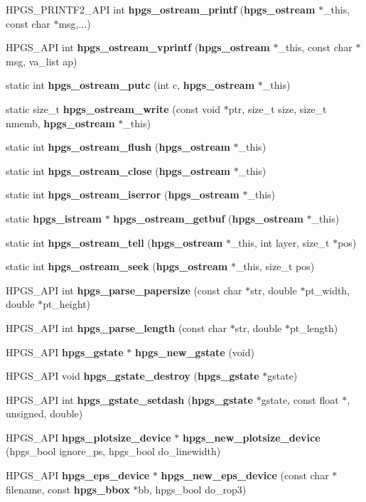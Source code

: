 \begin{DoxyCompactItemize}
\item 
HPGS\_\-PRINTF2\_\-API int {\bf hpgs\_\-ostream\_\-printf} ({\bf hpgs\_\-ostream} $\ast$\_\-this, const char $\ast$msg,...)
\item 
HPGS\_\-API int {\bf hpgs\_\-ostream\_\-vprintf} ({\bf hpgs\_\-ostream} $\ast$\_\-this, const char $\ast$msg, va\_\-list ap)
\item 
static int {\bf hpgs\_\-ostream\_\-putc} (int c, {\bf hpgs\_\-ostream} $\ast$\_\-this)
\item 
static size\_\-t {\bf hpgs\_\-ostream\_\-write} (const void $\ast$ptr, size\_\-t size, size\_\-t nmemb, {\bf hpgs\_\-ostream} $\ast$\_\-this)
\item 
static int {\bf hpgs\_\-ostream\_\-flush} ({\bf hpgs\_\-ostream} $\ast$\_\-this)
\item 
static int {\bf hpgs\_\-ostream\_\-close} ({\bf hpgs\_\-ostream} $\ast$\_\-this)
\item 
static int {\bf hpgs\_\-ostream\_\-iserror} ({\bf hpgs\_\-ostream} $\ast$\_\-this)
\item 
static {\bf hpgs\_\-istream} $\ast$ {\bf hpgs\_\-ostream\_\-getbuf} ({\bf hpgs\_\-ostream} $\ast$\_\-this)
\item 
static int {\bf hpgs\_\-ostream\_\-tell} ({\bf hpgs\_\-ostream} $\ast$\_\-this, int layer, size\_\-t $\ast$pos)
\item 
static int {\bf hpgs\_\-ostream\_\-seek} ({\bf hpgs\_\-ostream} $\ast$\_\-this, size\_\-t pos)
\item 
HPGS\_\-API int {\bf hpgs\_\-parse\_\-papersize} (const char $\ast$str, double $\ast$pt\_\-width, double $\ast$pt\_\-height)
\item 
HPGS\_\-API int {\bf hpgs\_\-parse\_\-length} (const char $\ast$str, double $\ast$pt\_\-length)
\item 
HPGS\_\-API {\bf hpgs\_\-gstate} $\ast$ {\bf hpgs\_\-new\_\-gstate} (void)
\item 
HPGS\_\-API void {\bf hpgs\_\-gstate\_\-destroy} ({\bf hpgs\_\-gstate} $\ast$gstate)
\item 
HPGS\_\-API int {\bf hpgs\_\-gstate\_\-setdash} ({\bf hpgs\_\-gstate} $\ast$gstate, const float $\ast$, unsigned, double)
\item 
HPGS\_\-API {\bf hpgs\_\-plotsize\_\-device} $\ast$ {\bf hpgs\_\-new\_\-plotsize\_\-device} (hpgs\_\-bool ignore\_\-ps, hpgs\_\-bool do\_\-linewidth)
\item 
HPGS\_\-API {\bf hpgs\_\-eps\_\-device} $\ast$ {\bf hpgs\_\-new\_\-eps\_\-device} (const char $\ast$filename, const {\bf hpgs\_\-bbox} $\ast$bb, hpgs\_\-bool do\_\-rop3)

\end{DoxyCompactItemize}

